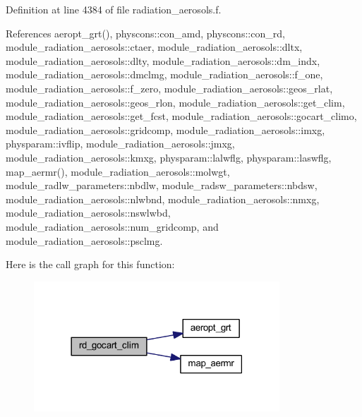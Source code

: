 Definition at line 4384 of file radiation\+\_\+aerosols.\+f.



References aeropt\+\_\+grt(), physcons\+::con\+\_\+amd, physcons\+::con\+\_\+rd, module\+\_\+radiation\+\_\+aerosols\+::ctaer, module\+\_\+radiation\+\_\+aerosols\+::dltx, module\+\_\+radiation\+\_\+aerosols\+::dlty, module\+\_\+radiation\+\_\+aerosols\+::dm\+\_\+indx, module\+\_\+radiation\+\_\+aerosols\+::dmclmg, module\+\_\+radiation\+\_\+aerosols\+::f\+\_\+one, module\+\_\+radiation\+\_\+aerosols\+::f\+\_\+zero, module\+\_\+radiation\+\_\+aerosols\+::geos\+\_\+rlat, module\+\_\+radiation\+\_\+aerosols\+::geos\+\_\+rlon, module\+\_\+radiation\+\_\+aerosols\+::get\+\_\+clim, module\+\_\+radiation\+\_\+aerosols\+::get\+\_\+fcst, module\+\_\+radiation\+\_\+aerosols\+::gocart\+\_\+climo, module\+\_\+radiation\+\_\+aerosols\+::gridcomp, module\+\_\+radiation\+\_\+aerosols\+::imxg, physparam\+::ivflip, module\+\_\+radiation\+\_\+aerosols\+::jmxg, module\+\_\+radiation\+\_\+aerosols\+::kmxg, physparam\+::lalwflg, physparam\+::laswflg, map\+\_\+aermr(), module\+\_\+radiation\+\_\+aerosols\+::molwgt, module\+\_\+radlw\+\_\+parameters\+::nbdlw, module\+\_\+radsw\+\_\+parameters\+::nbdsw, module\+\_\+radiation\+\_\+aerosols\+::nlwbnd, module\+\_\+radiation\+\_\+aerosols\+::nmxg, module\+\_\+radiation\+\_\+aerosols\+::nswlwbd, module\+\_\+radiation\+\_\+aerosols\+::num\+\_\+gridcomp, and module\+\_\+radiation\+\_\+aerosols\+::psclmg.



Here is the call graph for this function\+:
\nopagebreak
\begin{figure}[H]
\begin{center}
\leavevmode
\includegraphics[width=261pt]{zhang__orig_2radiation__aerosols_8f_a15bad8499ffd17d967e5788cd6721c4d_cgraph}
\end{center}
\end{figure}


